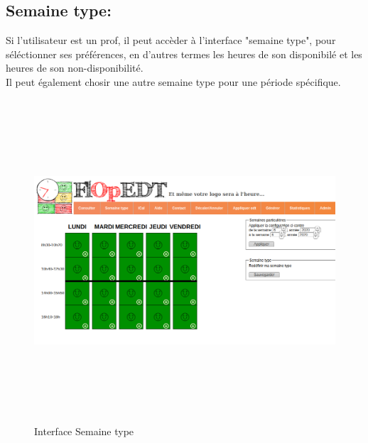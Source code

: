 \subsection*{Semaine type:}
Si l'utilisateur est un prof, il peut accèder à l'interface "semaine type", pour séléctionner ses préférences, en d'autres termes les heures de son disponibilé et les heures de son non-disponibilité. \\
Il peut également chosir une autre semaine type pour une période spécifique.
\begin{figure}[H]
      \centering
        \includegraphics[width=14cm,height=12cm]{img/2.png}
        \caption{Interface Semaine type}
\end{figure}
\newpage
